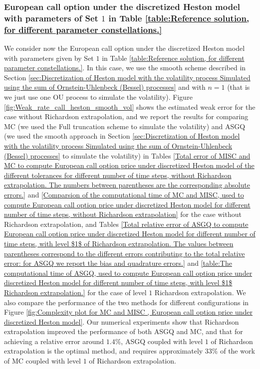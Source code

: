 \subsubsection{European call option  under the discretized  Heston model with parameters of Set $1$ in Table \ref{table:Reference solution, for different parameter constellations.}}\label{sec:European call option  under the discretized  Heston model with parameters of Set 1}
We consider now  the European call option  under the discretized  Heston model  with parameters given by Set $1$ in Table \ref{table:Reference solution, for different parameter constellations.}. In this case, we use the smooth scheme described  in  Section \ref{sec:Discretization of Heston model with the volatility process Simulated using the sum of  Ornstein-Uhlenbeck (Bessel) processes} and with  $n=1$ (that is we just use one OU process to simulate the volatility). Figure \ref{fig:Weak_rate_call_heston_smooth_vol} shows the estimated weak error  for the case without Richardson extrapolation, and we report the results for comparing MC (we used the Full truncation scheme to simulate the volatility) and ASGQ (we used the smooth approach in Section \ref{sec:Discretization of Heston model with the volatility process Simulated using the sum of  Ornstein-Uhlenbeck (Bessel) processes} to simulate the volatility) in Tables \ref{Total error of MISC and MC to compute European call option price under discretized Heston model of the different tolerances for different number of time steps, without Richardson extrapolation. The numbers between parentheses are the corresponding absolute errors.} and \ref{Comparsion of the computational time of  MC and MISC, used to compute European call option price under discretized Heston model for different number of time steps, without Richardson extrapolation} for the case without Richardson extrapolation, and  Tables \ref{Total relative  error of ASGQ  to compute European call option price under discretized Heston model for different number of time steps, with level $1$ of Richardson extrapolation. The values between parentheses correspond to the different errors contributing to the total relative error: for ASGQ we report the bias and quadrature errors.} and \ref{table:The computational time of  ASGQ, used to compute European call option price under discretized Heston model for different number of time steps, with level $1$ Richardson extrapolation.} for the case of level $1$ Richardson extrapolation. We also compare the performance of the two methods for different configurations in  Figure \ref{fig:Complexity plot for MC and MISC , European call option price under discretized Heston model}.  Our numerical experiments show that Richardson extrapolation improved the performance of both ASGQ and MC, and that for achieving a relative error around $1.4\%$, ASGQ  coupled with level $1$ of Richardson extrapolation is the optimal method, and  requires approximately $33\%$ of the work of MC  coupled with level $1$ of Richardson extrapolation. 
 

